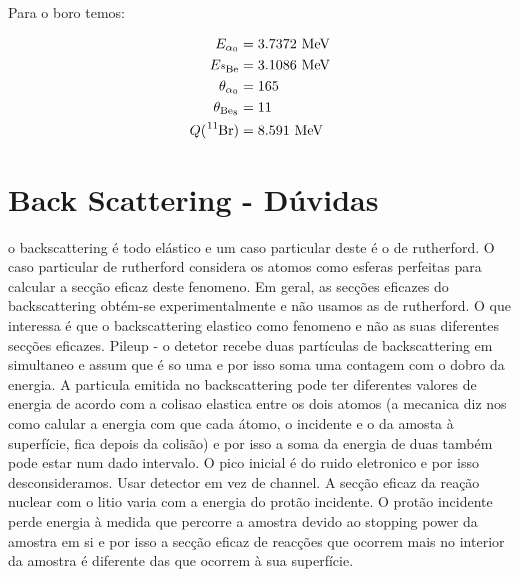 \documentclass{article}
\begin{document}
\begin{multicols}{2}
\paragraph*{} Para o boro temos:

\begin{equation}
\begin{split}
  E_{\alpha_0} &= 3.7372 \text{ MeV} \\
  E_{\ce{^8Be}} &= 3.1086 \text{ MeV} \\
  \theta_{\alpha_0} &= 165 \\
  \theta_{\ce{Be8}} &= 11 \\
  Q (\ce{^11Br}) &= 8.591 \text{ MeV} \\
\end{split}
\label{eq:energiesBr}
\end{equation}


\section{Back Scattering - Dúvidas}

o backscattering é todo elástico e um caso particular deste é o de rutherford.
O caso particular de rutherford considera os atomos como esferas perfeitas para calcular a secção eficaz deste fenomeno.
Em geral, as secções eficazes do backscattering obtém-se experimentalmente e não usamos as de rutherford.
O que interessa é que o backscattering elastico como fenomeno e não as suas diferentes secções eficazes.
Pileup - o detetor recebe duas partículas de backscattering em simultaneo e assum que é so uma e por isso soma uma contagem com o dobro da energia.
A particula emitida no backscattering pode ter diferentes valores de energia de acordo com a colisao elastica entre os dois atomos (a mecanica diz nos como calular a energia com que cada átomo, o incidente e o da amosta à superfície, fica depois da colisão) e por isso a soma da energia de duas também pode estar num dado intervalo.
O pico inicial é do ruido eletronico e por isso desconsideramos. Usar detector em vez de channel.
A secção eficaz da reação nuclear com o litio varia com a energia do protão incidente.
O protão incidente perde energia à medida que percorre a amostra devido ao stopping power da amostra em si e por isso a secção eficaz de reacções que ocorrem mais no interior da amostra é diferente das que ocorrem à sua superfície.


\printbibliography
\nocite{*}

\end{multicols}
\end{document}
